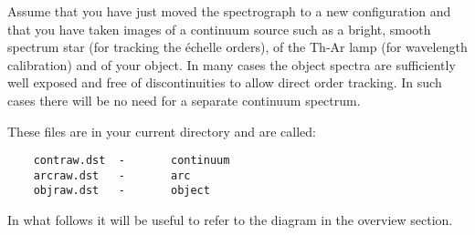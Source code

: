 Assume that you have just moved the spectrograph to a new configuration and
that you have taken images of a continuum source such as a bright, smooth
spectrum star (for tracking the \'echelle orders), of the Th-Ar lamp (for
wavelength calibration) and of your object. In many cases the object spectra
are sufficiently well exposed and free of discontinuities to allow direct order
tracking. In such cases there will be no need for a separate continuum
spectrum.

These files are in your current directory and are called:

\begin{verbatim}
    contraw.dst  -       continuum
    arcraw.dst   -       arc
    objraw.dst   -       object
\end{verbatim}

In what follows it will be useful to refer to the diagram in the overview
section.

